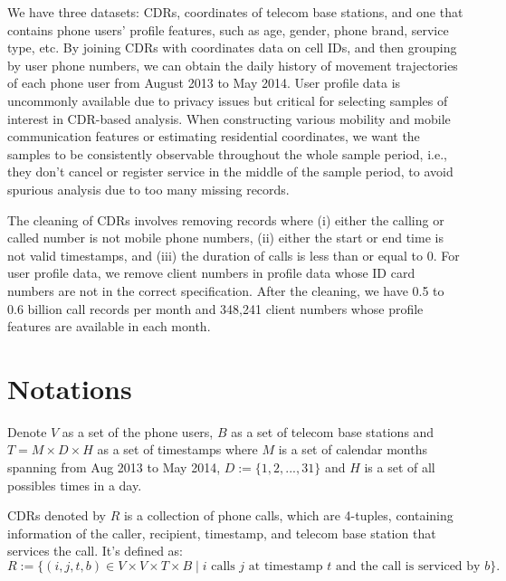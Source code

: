 We have three datasets: CDRs, coordinates of telecom base stations, and one that contains phone users' profile features, such as age, gender, phone brand, service type, etc. By joining CDRs with coordinates data on cell IDs, and then grouping by user phone numbers, we can obtain the daily history of movement trajectories of each phone user from August 2013 to May 2014. User profile data is uncommonly available due to privacy issues but critical for selecting samples of interest in CDR-based analysis. When constructing various mobility and mobile communication features or estimating residential coordinates, we want the samples to be consistently observable throughout the whole sample period, i.e., they don't cancel or register service in the middle of the sample period, to avoid spurious analysis due to too many missing records.

The cleaning of CDRs involves removing records where (i) either the calling or called number is not mobile phone numbers, (ii) either the start or end time is not valid timestamps, and (iii) the duration of calls is less than or equal to 0. For user profile data, we remove client numbers in profile data whose ID card numbers are not in the correct specification. After the cleaning, we have 0.5 to 0.6 billion call records per month and 348,241 client numbers whose profile features are available in each month.


\section{Notations}\label{sec:notations}
Denote $V$ as a set of the phone users, $B$ as a set of telecom base stations and $T = M \times D \times H$ as a set of timestamps where $M$ is a set of calendar months spanning from Aug 2013 to May 2014, $D := \{1, 2, ..., 31\}$ and $H$ is a set of all possibles times in a day.

\begin{definition}
CDRs denoted by $R$ is a collection of phone calls, which are 4-tuples, containing information of the caller, recipient, timestamp, and telecom base station that services the call. It's defined as:
$$
R := \{
  (i, j, t, b) \in V \times V \times T \times B
  \mid
  i \text{ calls } j \text{ at timestamp } t \text{ and }
  \text{the call is serviced by } b
\}.
$$
\end{definition}

